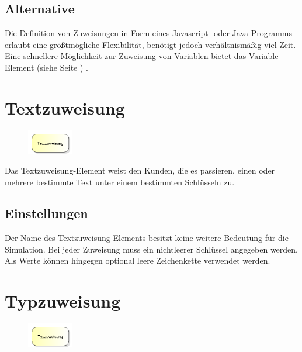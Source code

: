 \subsection*{Alternative}

Die Definition von Zuweisungen in Form eines Javascript- oder Java-Programms erlaubt eine größtmögliche Flexibilität,
benötigt jedoch verhältnismäßig viel Zeit. Eine schnellere Möglichkeit zur Zuweisung von Variablen
bietet das Variable-Element (siehe Seite \pageref{ref:ModelElementSet}) .


\section{Textzuweisung}
\label{ref:ModelElementAssignString}

\begin{figure}
\vspace{-22pt}
\includegraphics[width=2cm]{imageModelElementAssignString.png}
\vspace{-22pt}
\end{figure}

Das Textzuweisung-Element weist den Kunden, die es passieren, einen oder mehrere bestimmte Text
unter einem bestimmten Schlüsseln zu.

\subsection*{Einstellungen}

Der Name des Textzuweisung-Elements besitzt keine weitere Bedeutung für die Simulation. Bei jeder
Zuweisung muss ein nichtleerer Schlüssel angegeben werden. Als Werte können hingegen optional
leere Zeichenkette verwendet werden.


\section{Typzuweisung}
\label{ref:ModelElementAssign}

\begin{figure}
\vspace{-22pt}
\includegraphics[width=2cm]{imageModelElementAssign.png}
\vspace{-22pt}
\end{figure}

